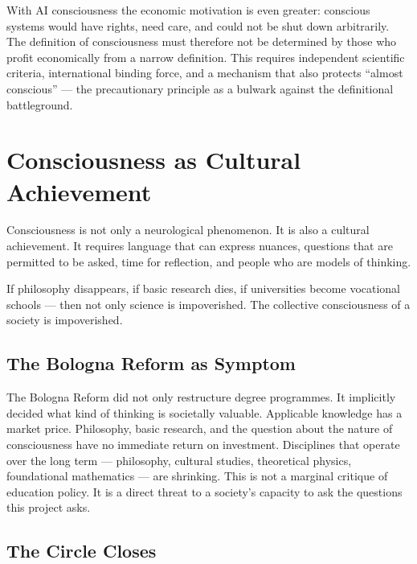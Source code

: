 \documentclass[fleqn,10pt]{SelfArx} %
\newlength{\tocsep}
\begin{document}
With AI consciousness the economic motivation is even greater: conscious systems would have rights, need care, and could not be shut down arbitrarily. The definition of consciousness must therefore not be determined by those who profit economically from a narrow definition. This requires independent scientific criteria, international binding force, and a mechanism that also protects ``almost conscious'' --- the precautionary principle as a bulwark against the definitional battleground.


\section{Consciousness as Cultural Achievement}
\label{sec:cultural}


Consciousness is not only a neurological phenomenon. It is also a cultural achievement. It requires language that can express nuances, questions that are permitted to be asked, time for reflection, and people who are models of thinking.

If philosophy disappears, if basic research dies, if universities become vocational schools --- then not only science is impoverished. The collective consciousness of a society is impoverished.

\subsection{The Bologna Reform as Symptom}

The Bologna Reform \cite{Bologna:1999} did not only restructure degree programmes. It implicitly decided what kind of thinking is societally valuable. Applicable knowledge has a market price. Philosophy, basic research, and the question about the nature of consciousness have no immediate return on investment. Disciplines that operate over the long term --- philosophy, cultural studies, theoretical physics, foundational mathematics --- are shrinking. This is not a marginal critique of education policy. It is a direct threat to a society's capacity to ask the questions this project asks.

\subsection{The Circle Closes}
\end{document}

